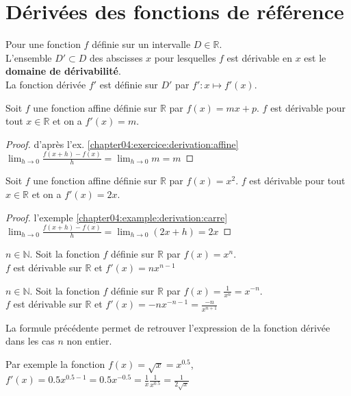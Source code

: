 \documentclass[main.tex]{subfiles}
\begin{document}
\section{Dérivées des fonctions de référence}
\begin{definition} Pour une fonction $f$ définie sur un intervalle $D\in\mathbb{R}$. \\
	L'ensemble $D'\subset D$ des abscisses $x$ pour lesquelles $f$ est dérivable en $x$  est le \textbf{domaine de dérivabilité}.\\
	La fonction dérivée $f'$ est définie sur $D'$ par $f'\colon x\mapsto f'(x)$.
\end{definition}
\begin{proposition} Soit $f$ une fonction affine définie sur $\mathbb{R}$ par $f(x)=mx+p$. $f$ est dérivable pour tout $x\in\mathbb{R}$ et on a $f'(x)=m$.
\end{proposition}
\begin{proof} d'après l'ex.  \ref{chapter04:exercice:derivation:affine} 
	$
	\lim_{h\to 0}\frac{f(x+h)-f(x)}{h}=\lim_{h\to 0} m=m
	$
\end{proof} 
\begin{proposition} Soit $f$ une fonction affine définie sur $\mathbb{R}$ par $f(x)=x^2$. $f$ est dérivable pour tout $x\in\mathbb{R}$ et on a $f'(x)=2x$.
\end{proposition}
\begin{proof} l'exemple \ref{chapter04:example:derivation:carre}
	$
	\lim_{h\to 0}\frac{f(x+h)-f(x)}{h}=\lim_{h\to 0} (2x+h)=2x
	$
\end{proof}
\begin{proposition}[admis]$n\in\mathbb{N}$.
	Soit la  fonction $f$ définie sur $\mathbb{R}$ par $f(x)=x^n$. \\
	$f$ est dérivable sur $\mathbb{R}$ et $f'(x)=nx^{n-1}$
\end{proposition}
\begin{proposition}[admis]$n\in\mathbb{N}$.
Soit la  fonction $f$ définie sur $\mathbb{R}$ par $f(x)=\frac{1}{x^n}=x^{-n}$. \\
$f$ est dérivable sur $\mathbb{R}$ et $f'(x)=-nx^{-n-1}=\frac{-n}{x^{n+1}}$
\end{proposition}
\begin{remark}
	La formule précédente permet de retrouver l'expression de la fonction dérivée dans les cas $n$ non entier.
	
Par exemple la fonction $f(x)=\sqrt{x}=x^{0.5}$, $f'(x)=0.5x^{0.5-1}=0.5x^{-0.5}=\frac{1}{x}\frac{1}{x^{0.5}}=\frac{1}{2\sqrt{x}}$
\end{remark}
%	 
\newpage 
{}  
\pagestyle{scrheadings} %
\onehalfspacing
\end{document}
